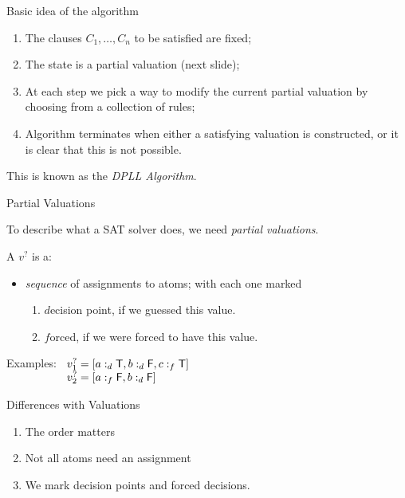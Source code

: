 \documentclass[xetex,aspectratio=169,14pt,hyperref={pdfpagelabels=true,pdflang={en-GB}}]{beamer}
\begin{document}
\begin{frame}
  {Basic idea of the algorithm}

  \begin{enumerate}
  \item The clauses $C_1, \dots, C_n$ to be satisfied are fixed;
  \item The state is a partial valuation \textcolor{black!60}{(next slide)};
  \item At each step we pick a way to modify the current partial
    valuation by choosing from a collection of rules;
  \item Algorithm terminates when either a satisfying valuation is
    constructed, or it is clear that this is not possible.
  \end{enumerate}

  \bigskip

  This is known as the \emph{DPLL Algorithm}.
\end{frame}

\begin{frame}
  {Partial Valuations}

  To describe what a SAT solver does, we need \emph{partial valuations}.

  \bigskip

  A  $v^?$ is a:
  \begin{itemize}
  \item \emph{sequence} of assignments to atoms; with each one marked
    \begin{enumerate}
    \item $d$ecision point, if we guessed this value.
    \item $f$orced, if we were forced to have this value.
    \end{enumerate}
  \end{itemize}

\medskip

  Examples:
  $\begin{array}[t]{l}
      v_1^? = [ a :_d \mathsf{T}, b :_d \mathsf{F}, c :_f \mathsf{T} ] \\
      v_2^? = [ a :_f \mathsf{F}, b :_d \mathsf{F} ] \\
    \end{array}$
\end{frame}

\begin{frame}
  {Differences with Valuations}

  \begin{enumerate}
  \item The order matters\\
  \item Not all atoms need an assignment\\
  \item We mark decision points and forced decisions.
  \end{enumerate}
\end{frame}
\end{document}
